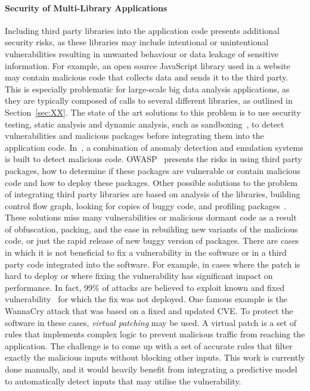 \documentclass[a4paper,11pt]{article}
\begin{document}
\paragraph{Security of Multi-Library Applications}
Including third party libraries into the application code presents additional security risks, as these libraries may include intentional or unintentional vulnerabilities resulting in unwanted behaviour or data leakage of sensitive  information. For example, an open source JavaScript library used in a website may contain malicious code that collects data and sends it to the third party. This is especially problematic for large-scale big data analysis applications, as they are typically composed of calls to several different libraries, as outlined in Section~\ref{sec:XX}. The state of the art solutions to this problem is to use security testing, static analysis and dynamic analysis, such as sandboxing~\cite{jsand}, to detect vulnerabilities and malicious packages before integrating them into the application code. In~\cite{Cova}, a combination of anomaly detection and emulation systems is built to detect malicious code. OWASP~\cite{OWASP} presents the risks in using third party  packages, how to determine if these packages are vulnerable or contain malicious code and how to deploy these packages. Other possible solutions to the problem of integrating third party libraries are based on analysis of the libraries, building control flow graph, looking for copies of buggy code, and profiling packages~\cite{Hanna, XinSun}. These solutions miss many vulnerabilities or malicious dormant code as a result of obfuscation, packing, and the ease in rebuilding new variants of the malicious code, or just the rapid release of new buggy version of packages. There are cases in which it is not beneficial to fix a vulnerability in the software or in a third party code integrated into the software. For example, in cases where the patch is hard to deploy or where fixing the vulnerability has significant impact on performance. In fact, 99\% of attacks are believed to exploit known and fixed vulnerability~\cite{GartnerVulnerability} for which the fix was not deployed. One famous example is the WannaCry attack that was based on a fixed and updated CVE. To protect the software in these cases, \emph{virtual patching} may be used. A virtual patch is a set of rules that implements complex logic to prevent malicious traffic from reaching the application. The challenge is to come up with a set of accurate rules that filter exactly the malicious inputs without blocking other inputs. This work is currently done manually, and it would heavily benefit from integrating a predictive model to automatically detect inputs that may utilise the vulnerability.
\end{document}
